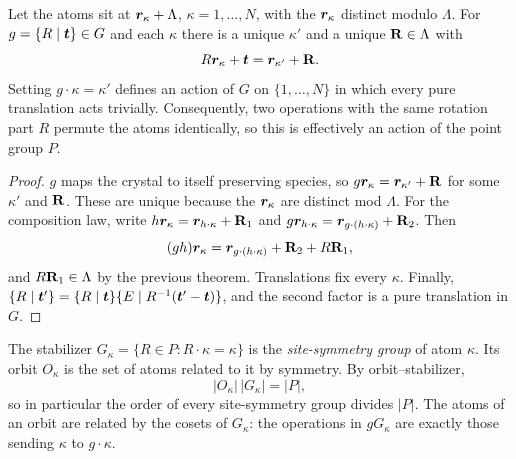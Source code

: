 \begin{theorem}
Let the atoms sit at $\bm{r}_\kappa + \Lambda$, $\kappa = 1,\ldots,N$, with the $\bm{r}_\kappa$ distinct modulo $\Lambda$. For $g = \{R\mid\bm{t}\}\in G$ and each $\kappa$ there is a unique $\kappa'$ and a unique $\cvect{R}\in\Lambda$ with
\[
    R\lvect{r}_\kappa + \lvect{t} = \lvect{r}_{\kappa'} + \cvect{R}.
\]
Setting $g\cdot\kappa = \kappa'$ defines an action of $G$ on $\{1,\ldots,N\}$ in which every pure translation acts trivially. Consequently, two operations with the same rotation part $R$ permute the atoms identically, so this is effectively an action of the point group $P$.
\end{theorem}
\begin{proof}
$g$ maps the crystal to itself preserving species, so $g\lvect{r}_\kappa = \lvect{r}_{\kappa'}+\cvect{R}$ for some $\kappa'$ and $\cvect{R}$. These are unique because the $\bm{r}_\kappa$ are distinct mod $\Lambda$. For the composition law, write $h\lvect{r}_\kappa = \lvect{r}_{h\cdot\kappa}+\cvect{R}_1$ and $g\lvect{r}_{h\cdot\kappa} = \lvect{r}_{g\cdot(h\cdot\kappa)}+\cvect{R}_2$. Then
\[
    (gh)\lvect{r}_\kappa = \lvect{r}_{g\cdot(h\cdot\kappa)} + \cvect{R}_2 + R\cvect{R}_1,
\]
and $R\cvect{R}_1\in\Lambda$ by the previous theorem. Translations fix every $\kappa$. Finally, $\{R\mid\bm{t}'\} = \{R\mid\bm{t}\}\{E\mid R^{-1}(\bm{t}'-\bm{t})\}$, and the second factor is a pure translation in $G$.
\end{proof}

\begin{definition}
The stabilizer $G_\kappa = \{R\in P : R\cdot\kappa = \kappa\}$ is the \emph{site-symmetry group} of atom $\kappa$. Its orbit $O_\kappa$ is the set of atoms related to it by symmetry. By orbit--stabilizer,
\begin{equation}
    |O_\kappa|\,|G_\kappa| = |P|,
\end{equation}
so in particular the order of every site-symmetry group divides $|P|$. The atoms of an orbit are related by the cosets of $G_\kappa$: the operations in $gG_\kappa$ are exactly those sending $\kappa$ to $g\cdot\kappa$.
\end{definition}

